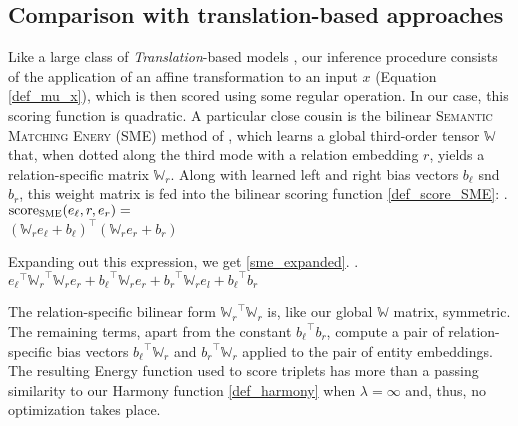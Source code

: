 \documentclass[a4paper,10pt]{article}
\begin{document}
\subsection{Comparison with translation-based approaches}

Like a large class of \emph{Translation}-based models \citep{bordes2011transe,yoon2016translation,lin2015transR,ji2016sparseTrans}, our inference procedure consists of the application of an affine transformation to an input $x$ (Equation \ref{def_mu_x}), which is then scored using some regular operation. In our case, this scoring function is quadratic. A particular close cousin is the bilinear \textsc{Semantic Matching Enery} (\textsc{SME}) method of \citet{bordes2014semanticenergy}, which learns a global third-order tensor $\mathbb{W}$ that, when dotted along the third mode with a relation embedding $r$, yields a relation-specific matrix $\mathbb{W}_r$. Along with learned left and right bias vectors $b_\ell$ snd $b_r$, this weight matrix is fed into the bilinear scoring function \ref{def_score_SME}:
\ex. $\text{score}_\textsc{SME}(e_\ell, r, e_r) = $\\
\phantom{h}\hfill $(\mathbb{W}_r e_\ell + b_\ell)^\top (\mathbb{W}_r e_r + b_r)$\label{def_score_SME}

Expanding out this expression, we get \ref{sme_expanded}.
\ex. ${e_\ell}^\top {\mathbb{W}_r}^\top\mathbb{W}_r e_r + {b_\ell}^\top \mathbb{W}_r e_r + {b_r}^\top \mathbb{W}_r e_l + {b_\ell}^\top b_r $
\label{sme_expanded}

The relation-specific bilinear form ${\mathbb{W}_r}^\top \mathbb{W}_r$ is, like our global $\mathbb{W}$ matrix, symmetric. The remaining terms, apart from the constant ${b_\ell}^\top b_r$, compute a pair of relation-specific bias vectors ${b_\ell}^\top \mathbb{W}_r$ and ${b_r}^\top \mathbb{W}_r$ applied to the pair of entity embeddings.	The resulting Energy function used to score triplets has more than a passing similarity to our Harmony function \ref{def_harmony} when $\lambda = \infty$ and, thus, no optimization takes place. 
\end{document}

